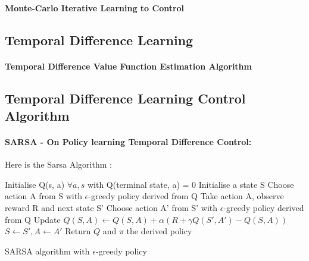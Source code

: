 		\paragraph*{Monte-Carlo Iterative Learning to Control}

	\subsection{Temporal Difference Learning} %
		\label{sub:temporal_difference_learning}
		
		\paragraph*{Temporal Difference Value Function Estimation Algorithm}

	\subsection{Temporal Difference Learning Control Algorithm} %
		\label{sub:temporal_difference_learning_control_algorithm}
		
		\paragraph*{SARSA - On Policy learning Temporal Difference Control:}
			Here is the Sarsa Algorithm : \\
			\begin{algorithm}[H]
				Initialise Q(s, a) $\forall a, s$ with Q(terminal state, a) = 0  \;
				{
					Initialise a state S\;
					Choose action A from S with $\epsilon$-greedy policy derived from Q\;
					{
						Take action A, observe reward R and next state S'\;
						Choose action A' from S' with $\epsilon$-greedy policy derived from Q\;
						Update $Q(S, A) \leftarrow Q(S, A) + \alpha (R + \gamma Q(S', A')- Q(S, A))$\;
						$S \leftarrow S', A \leftarrow A'$
					}
				}
				Return $Q$ and $\pi$ the derived policy
				\caption{SARSA algorithm with $\epsilon$-greedy policy}
			\end{algorithm}
			

